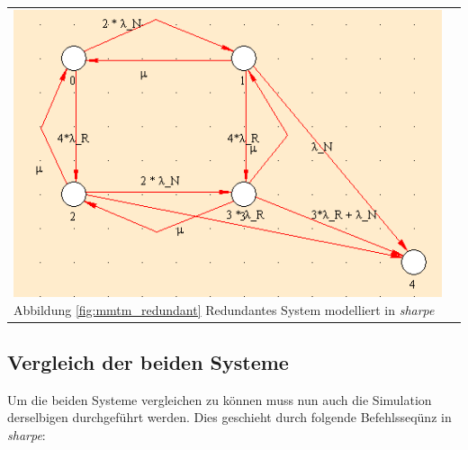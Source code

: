 \documentclass[10pt,a4paper]{article}
\begin{document}
\begin{adjustwidth}{-1in}{0in}
\begin{tabular}[c]{ll}


\begin{minipage}{0.8\textwidth}


\includegraphics[width=\linewidth]{MTTM_ReduntantesModell.png}
\label{fig:mmtm_redundant}
Abbildung \ref{fig:mmtm_redundant} Redundantes System modelliert in \textit{sharpe}
\end{minipage}
 
 & \begin{minipage}{0.8\textwidth}
 \end{minipage} \\ 

\end{tabular} 
\end{adjustwidth}


\newpage
\subsection{Vergleich der beiden Systeme}
\label{subsec:mttf_res}
Um die beiden Systeme vergleichen zu können muss nun auch die Simulation derselbigen durchgeführt werden. Dies geschieht durch folgende Befehlsseqünz in \textit{sharpe}:

\end{document}
